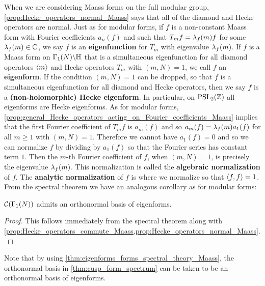       When we are considering Maass forms on the full modular group, \cref{prop:Hecke_operators_normal_Maass} says that all of the diamond and Hecke operators are normal. Just as for modular forms, if $f$ is a non-constant Maass form with Fourier coefficients $a_{n}(f)$ and such that $T_{m}f = \lambda_{f}(m)f$ for some $\lambda_{f}(m) \in \mathbb{C}$, we say $f$ is an \textbf{eigenfunction} for $T_{m}$ with eigenvalue $\lambda_{f}(m)$. If $f$ is a Maass form on $\Gamma_{1}(N)\backslash\mathbb{H}$ that is a simultaneous eigenfunction for all diamond operators $\langle m\rangle$ and Hecke operators $T_{m}$ with $(m,N) = 1$, we call $f$ an \textbf{eigenform}. If the condition $(m,N) = 1$ can be dropped, so that $f$ is a simultaneous eigenfunction for all diamond and Hecke operators, then we say $f$ is a \textbf{(non-holomorphic) Hecke eigenform}. In particular, on $\mathrm{PSL}_{2}(\mathbb{Z})$ all eigenforms are Hecke eigenforms. As for modular forms, \cref{prop:general_Hecke_operators_acting_on_Fourier_coefficients_Maass} implies that the first Fourier coefficient of $T_{m}f$ is $a_{m}(f)$ and so $a_{m}(f) = \lambda_{f}(m)a_{1}(f)$ for all $m \ge 1$ with $(m,N) = 1$. Therefore we cannot have $a_{1}(f) = 0$ and so we can normalize $f$ by dividing by $a_{1}(f)$ so that the Fourier series has constant term $1$. Then the $m$-th Fourier coefficient of $f$, when $(m,N) = 1$, is precisely the eigenvalue $\lambda_{f}(m)$. This normalization is called the \textbf{algebraic normalization} of $f$. The \textbf{analytic normalization} of $f$ is where we normalize so that $\langle f,f\rangle = 1$. From the spectral theorem we have an analogous corollary as for modular forms:

      \begin{theorem}\label{thm:eigenforms_forms_spectral_theory_Maass}
        $\mathcal{C}(\Gamma_{1}(N))$ admits an orthonormal basis of eigenforms.
      \end{theorem}
      \begin{proof}
        This follows immediately from the spectral theorem along with \cref{prop:Hecke_operators_commute_Maass,prop:Hecke_operators_normal_Maass}.
      \end{proof}

      Note that by using \cref{thm:eigenforms_forms_spectral_theory_Maass}, the orthonormal basis in \cref{thm:cusp_form_spectrum} can be taken to be an orthonormal basis of eigenforms.
    \subsection*{}
    \subsection*{}

